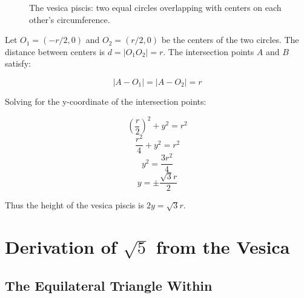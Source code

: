 \begin{figure}[H]
\centering
{}
\caption{The vesica piscis: two equal circles overlapping with centers on each other's circumference.}
\label{fa_01:fig:vesica}
\end{figure}

Let $O_1 = (-r/2, 0)$ and $O_2 = (r/2, 0)$ be the centers of the two circles. The distance between centers is $d = |O_1 O_2| = r$. The intersection points $A$ and $B$ satisfy:

\[
|A - O_1| = |A - O_2| = r
\]

Solving for the y-coordinate of the intersection points:

\[
\left(\frac{r}{2}\right)^2 + y^2 = r^2
\]
\[
\frac{r^2}{4} + y^2 = r^2
\]
\[
y^2 = \frac{3r^2}{4}
\]
\[
y = \pm\frac{\sqrt{3}r}{2}
\]

Thus the height of the vesica piscis is $2y = \sqrt{3}r$.

\section{Derivation of $\sqrt{5}$ from the Vesica}

\subsection{The Equilateral Triangle Within}

